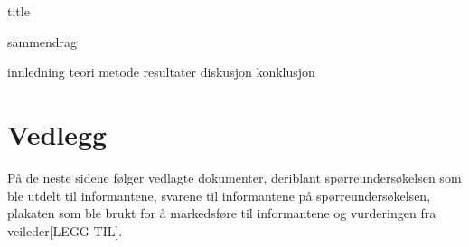 



{title}
\newpage

\cleardoublepage
\tableofcontents
\newpage

{sammendrag}


{innledning}
{teori}
{metode}
{resultater}
{diskusjon}
{konklusjon}

\newpage

\printbibliography[heading=bibintoc]
\listoffigures

\section*{Vedlegg}
På de neste sidene følger vedlagte dokumenter, deriblant spørreundersøkelsen som ble utdelt til informantene, svarene til informantene på spørreundersøkelsen, plakaten som ble brukt for å markedsføre til informantene og vurderingen fra veileder[LEGG TIL]. 







